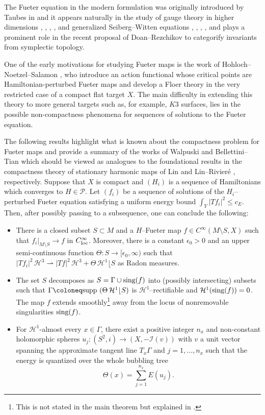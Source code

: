 \documentclass[11pt,a4paper]{article}
\theoremstyle{definition}
\newcommand{\loc}{\textnormal{loc}}
\newcommand{\sing}{\textnormal{sing}}
\newcommand{\supp}{\textnormal{supp }}
\newcommand{\cH}{\mathcal{H}}
\newcommand{\cI}{\mathcal{I}}
\newcommand{\cP}{\mathcal{P}}
\begin{document}
The Fueter equation in the modern formulation was originally introduced by Taubes in \cite{Ta99} and it appears naturally in the study of gauge theory in higher dimensions \cite{DS11}, \cite{Ha12}, \cite{HL24}, \cite{Wa17a}, \cite{Wa17b} and generalized Seiberg--Witten equations \cite{Do19}, \cite{DW20}, \cite{Ha15}, \cite{HW15}, \cite{Wi26} and plays a prominent role in the recent proposal of Doan--Rezchikov \cite{DR22} to categorify invariants from symplectic topology. 

One of the early motivations for studying Fueter maps is the work of Hohloch--Noetzel--Salamon \cite{HNS09}, \cite{Sa13} who introduce an action functional whose critical points are Hamiltonian-perturbed Fueter maps and develop a Floer theory in the very restricted case of a compact flat target $X$. The main difficulty in extending this theory to more general targets such as, for example, $K3$ surfaces, lies in the possible non-compactness phenomena for sequences of solutions to the Fueter equation.

The following results highlight what is known about the compactness problem for Fueter maps and provide a summary of the works of Walpuski \cite{W15} and Bellettini--Tian \cite{BT19} which should be viewed as analogues to the foundational results in the compactness theory of stationary harmonic maps of Lin \cite{Li99} and Lin--Rivieré \cite{LR02}, respectively. Suppose that $X$ is compact and $(H_i)$ is a sequence of Hamiltonians which converges to $H \in \cP$. Let $(f_i)$ be a sequence of solutions of the $H_i$--perturbed Fueter equation satisfying a uniform energy bound $\int_{Y} |T f_i|^2 \leq c_E$. Then, after possibly passing to a subsequence, one can conclude the following:
\begin{itemize}
  \item There is a closed subset $S \subset M$ and a $H$--Fueter map $f \in C^\infty(M \setminus S, X)$ such that $f_i |_{M\setminus S} \to f$ in $C^\infty_\loc$. Moreover, there is a constant $\epsilon_0 > 0$ and an upper semi-continuous function $\Theta: S \to [\epsilon_0,\infty)$ such that $|T f_i|^2 \,\cH^3 \rightharpoonup |T f|^2 \,\cH^3 + \Theta \,\cH^1\lfloor S$ as Radon measures.
  \item The set $S$ decomposes as $S = \Gamma \cup \sing(f)$ into (possibly intersecting) subsets such that $\Gamma \coloneq \supp(\Theta \,\cH^1\lfloor S)$ is $\cH^1$--rectifiable and $\cH^1(\sing(f))=0$. The map $f$ extends smoothly\footnote{This is not stated in the main theorem but explained in \cite[Fact (c), pp. 1296]{BT19}.} away from the locus of nonremovable singularities $\sing(f)$.
  \item For $\cH^1$-almost every $x \in \Gamma$, there exist a positive integer $n_x$ and non-constant holomorphic spheres $u_j : (S^2, i) \to (X,-\cI(v))$ with $v$ a unit vector spanning the approximate tangent line $T_x\Gamma$ and $j=1, \dots, n_x$ such that the energy is quantized over the whole bubbling tree
  \begin{equation}\label{energy quantization}
    \Theta(x) = \sum_{j=1}^{n_x} E(u_j).
  \end{equation}
\end{itemize}
\end{document}
